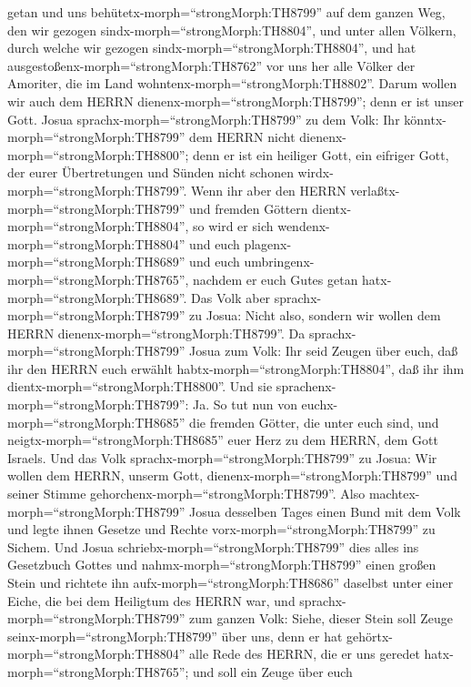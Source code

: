 getan und uns behütetx-morph=``strongMorph:TH8799'' auf dem ganzen Weg,
den wir gezogen sindx-morph=``strongMorph:TH8804'', und unter allen
Völkern, durch welche wir gezogen sindx-morph=``strongMorph:TH8804'',
 und hat ausgestoßenx-morph=``strongMorph:TH8762'' vor uns
her alle Völker der Amoriter, die im Land
wohntenx-morph=``strongMorph:TH8802''. Darum wollen wir auch dem HERRN
dienenx-morph=``strongMorph:TH8799''; denn er ist unser Gott.
 Josua sprachx-morph=``strongMorph:TH8799'' zu dem Volk:
Ihr könntx-morph=``strongMorph:TH8799'' dem HERRN nicht
dienenx-morph=``strongMorph:TH8800''; denn er ist ein heiliger Gott, ein
eifriger Gott, der eurer Übertretungen und Sünden nicht schonen
wirdx-morph=``strongMorph:TH8799''.  Wenn ihr aber den
HERRN verlaßtx-morph=``strongMorph:TH8799'' und fremden Göttern
dientx-morph=``strongMorph:TH8804'', so wird er sich
wendenx-morph=``strongMorph:TH8804'' und euch
plagenx-morph=``strongMorph:TH8689'' und euch
umbringenx-morph=``strongMorph:TH8765'', nachdem er euch Gutes getan
hatx-morph=``strongMorph:TH8689''.  Das Volk aber
sprachx-morph=``strongMorph:TH8799'' zu Josua: Nicht also, sondern wir
wollen dem HERRN dienenx-morph=``strongMorph:TH8799''.  Da
sprachx-morph=``strongMorph:TH8799'' Josua zum Volk: Ihr seid Zeugen
über euch, daß ihr den HERRN euch erwählt
habtx-morph=``strongMorph:TH8804'', daß ihr ihm
dientx-morph=``strongMorph:TH8800''. Und sie
sprachenx-morph=``strongMorph:TH8799'': Ja.  So tut nun von
euchx-morph=``strongMorph:TH8685'' die fremden Götter, die unter euch
sind, und neigtx-morph=``strongMorph:TH8685'' euer Herz zu dem HERRN,
dem Gott Israels.  Und das Volk
sprachx-morph=``strongMorph:TH8799'' zu Josua: Wir wollen dem HERRN,
unserm Gott, dienenx-morph=``strongMorph:TH8799'' und seiner Stimme
gehorchenx-morph=``strongMorph:TH8799''.  Also
machtex-morph=``strongMorph:TH8799'' Josua desselben Tages einen Bund
mit dem Volk und legte ihnen Gesetze und Rechte
vorx-morph=``strongMorph:TH8799'' zu Sichem.  Und Josua
schriebx-morph=``strongMorph:TH8799'' dies alles ins Gesetzbuch Gottes
und nahmx-morph=``strongMorph:TH8799'' einen großen Stein und richtete
ihn aufx-morph=``strongMorph:TH8686'' daselbst unter einer Eiche, die
bei dem Heiligtum des HERRN war,  und
sprachx-morph=``strongMorph:TH8799'' zum ganzen Volk: Siehe, dieser
Stein soll Zeuge seinx-morph=``strongMorph:TH8799'' über uns, denn er
hat gehörtx-morph=``strongMorph:TH8804'' alle Rede des HERRN, die er uns
geredet hatx-morph=``strongMorph:TH8765''; und soll ein Zeuge über euch

